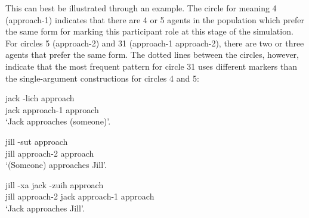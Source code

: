 This can best be illustrated through an example. The circle for meaning 4 (approach-1) indicates that there are 4  or 5 agents in the population which prefer the same form for marking this participant role at this stage of the simulation. For circles 5 (approach-2) and 31 (approach-1 approach-2), there are two or three agents that prefer the same form. The dotted lines between the circles, however, indicate that the most frequent pattern for circle 31 uses different markers than the single-argument constructions for circles 4 and 5:

\ea
\gll jack -lich approach\\
jack approach-1 approach\\
\glt `Jack approaches (someone)'.\\

\item
\gll jill -sut approach\\
jill approach-2 approach\\
\glt `(Someone) approaches Jill'.\\

\item
\gll jill -xa jack -zuih approach\\
jill approach-2 jack approach-1 approach\\
\glt `Jack approaches Jill'.\\
\z


